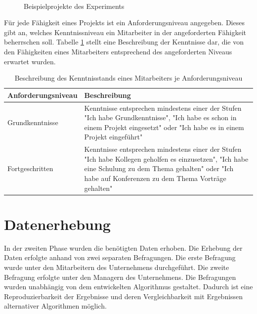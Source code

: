 \begin{figure}
    \\
\caption[Beispielprojekte des Experiments]{Beispielprojekte des Experiments}
  \label{fig:methodik:abb2}
\end{figure}

Für jede Fähigkeit eines Projekts ist ein Anforderungsniveau angegeben.
Dieses gibt an, welches Kenntnissniveau ein Mitarbeiter in der angeforderten Fähigkeit beherrschen soll.
Tabelle \ref{tab:methodik:tab1} stellt eine Beschreibung der Kenntnisse dar, die von den Fähigkeiten eines Mitarbeiters entsprechend des angeforderten Niveaus erwartet wurden.

\begin{table}[htbp]
    \begin{center}
    \begin{tabular}{p{1.5in}|p{3.25in}}
    {\textbf{Anforderungsniveau}} & {\textbf{Beschreibung}}\\
    \hline
	Grundkenntnisse & Kenntnisse entsprechen mindestens einer der Stufen "Ich habe Grundkenntnisse", "Ich habe es schon in einem Projekt eingesetzt" oder "Ich habe es in einem Projekt eingeführt" \\
    \hline
    Fortgeschritten & Kenntnisse entsprechen mindestens einer der Stufen "Ich habe Kollegen geholfen es einzusetzen", "Ich habe eine Schulung zu dem Thema gehalten" oder "Ich habe auf Konferenzen zu dem Thema Vorträge gehalten" \\
    \end{tabular}
    \end{center}
    \caption[Beschreibung des Kenntnisstands eines Mitarbeiters je Anforderungsniveau]{Beschreibung des Kenntnisstands eines Mitarbeiters je Anforderungsniveau}
	\label{tab:methodik:tab1}
\end{table}

\section{Datenerhebung}
\label{ch:methodik:datenerhebung}
In der zweiten Phase wurden die benötigten Daten erhoben.
Die Erhebung der Daten erfolgte anhand von zwei separaten Befragungen.
Die erste Befragung wurde unter den Mitarbeitern des Unternehmens durchgeführt.
Die zweite Befragung erfolgte unter den Managern des Unternehmens.
Die Befragungen wurden unabhängig von dem entwickelten Algorithmus gestaltet.
Dadurch ist eine Reproduzierbarkeit der Ergebnisse und deren Vergleichbarkeit mit Ergebnissen alternativer Algorithmen möglich.

